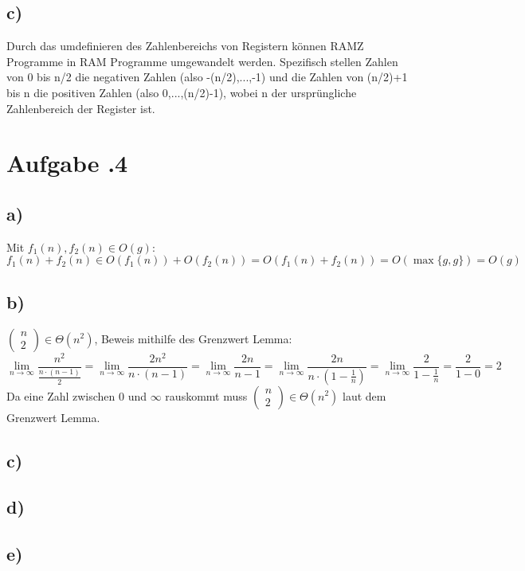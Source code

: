 \documentclass[12pt,german,a4paper]{article}
\begin{document}
	\subsection*{c)}
	Durch das umdefinieren des Zahlenbereichs von Registern können RAMZ Programme in RAM Programme umgewandelt werden. Spezifisch stellen Zahlen von 0 bis n/2 die negativen Zahlen (also -(n/2),...,-1) und die Zahlen von (n/2)+1 bis n die positiven Zahlen (also 0,...,(n/2)-1), wobei n der ursprüngliche Zahlenbereich der Register ist.
  \newpage
	\section*{Aufgabe \bn.4}
	\subsection*{a)}
	Mit $f_1(n),f_2(n)\in O(g)$:
	$$ f_1(n)+f_2(n) \in O(f_1(n)) + O(f_2(n))=O(f_1(n)+f_2(n))=O(\max\{g,g\})=O(g)$$
	\subsection*{b)}
	$\begin{pmatrix}n\\2\end{pmatrix}\in\Theta(n^2)$, Beweis mithilfe des Grenzwert Lemma:
	$$
	\lim _{ n \rightarrow \infty }  \frac{ n^2 }{ \frac{ n\cdot(n-1) }{ 2 } } = \lim _{ n \rightarrow \infty }\frac{ 2n^2 }{ n\cdot(n-1) } =\lim _{ n \rightarrow \infty }\frac{ 2n }{ n-1 } =\lim _{ n \rightarrow \infty }\frac{ 2n }{ n\cdot(1-\frac{ 1 }{ n } ) } =\lim _{ n \rightarrow \infty }\frac{ 2 }{ 1-\frac{ 1 }{ n }  } = \frac{ 2 }{ 1-0 } = 2
	$$
	Da eine Zahl zwischen 0 und $\infty$ rauskommt muss $\begin{pmatrix}n\\2\end{pmatrix}\in\Theta(n^2)$ laut dem Grenzwert Lemma.
	\subsection*{c)}
	\subsection*{d)}
	\subsection*{e)}
	
\end{document}
